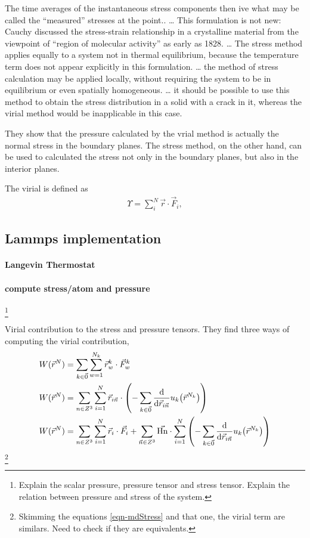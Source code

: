 \documentclass[../../main-notes.tex]{subfiles}
\begin{document}
The time averages of the instantaneous stress components then ive what may be called the ``measured'' stresses at the point.\citep{Tsai_1979}.
\ldots
This formulation is not new: Cauchy discussed the stress-strain relationship in a crystalline material from the viewpoint of ``region of molecular activity'' as early as 1828.
\ldots
The stress method applies equally to a system not in thermal equilibrium, because the temperature term does not appear explicitly in this formulation.
\ldots
the method of stress calculation may be applied locally, without requiring the system to be in equilibrium or even spatially homogeneous.
\ldots
it should be possible to use this method to obtain the stress distribution in a solid with a crack in it, whereas the virial method would be inapplicable in this case.

They show that the pressure calculated by the vrial method is actually the normal stress in the boundary planes.
The stress method, on the other hand, can be used to calculated the stress not only in the boundary planes, but also in the interior planes.

The virial is defined as 
\begin{gather}
    \Upsilon=\sum_i^N \vec{r}\cdot\vec{F}_i,
\end{gather}


\subsection{Lammps implementation}

\paragraph{Langevin Thermostat}

\paragraph{compute stress/atom and pressure}\footnote{Explain the scalar pressure, pressure tensor and stress tensor. Explain the relation between pressure and stress of the system.}

Virial contribution to the stress and pressure tensors\citep{Thompson_Plimpton_Mattson_2009}.
They find three ways of computing the virial contribution,
\begin{align}
    W(\vec{r}^N) &= \sum_{k\in\vec{0}}\sum_{w=1}^{N_k} \vec{r}^k_{w}\cdot\vec{F}^k_{w} \\
    W(\vec{r}^N) &= \sum_{n\in Z^3}\sum_{i=1}^N \vec{r}_{i\vec{n}}\cdot\left(
    -\sum_{k\in\vec{0}}\dv{\vec{r}_{i\vec{n}}}u_k\qty(\vec{r}^{N_k})\right) \\
        W(\vec{r}^N) &= \sum_{n\in Z^3}\sum_{i=1}^N \vec{r}_{i}\cdot\vec{F}_i 
    +\sum_{\vec{n}\in Z^3}\vec{\mathrm{Hn}}\cdot\sum_{i=1}^N\left(
    -\sum_{k\in\vec{0}}\dv{\vec{r}_{i\vec{n}}}u_k\qty(\vec{r}^{N_k})\right)
\end{align}
\footnote{Skimming the equations \eqref{eqn-mdStress} and that one, the virial term are similars. Need to check if they are equivalents. }
\end{document}
